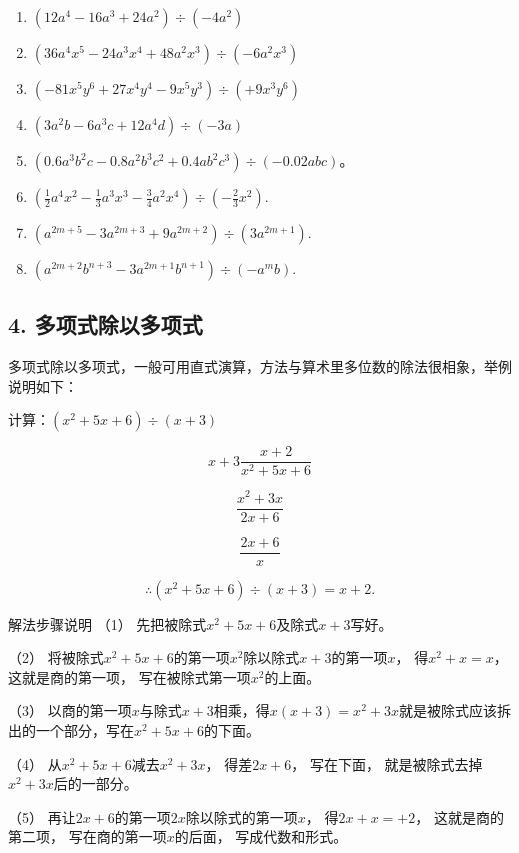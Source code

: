\begin{enumerate}[start=1]
\item
  \((12a^{4} - 16a^{3} + 24a^{2})\div (-4a^{2})\)
\item
  \((36a^{4}x^{5} - 24a^{3}x^{4} + 48a^{2}x^{3})\div (-6a^{2}x^{3})\)
\item
  \((-81x^{5}y^{6} + 27x^{4}y^{4} - 9x^{5}y^{3})\div (+9x^{3}y^{6})\)
\item
  \((3a^{2}b - 6a^{3}c + 12a^{4}d)\div (-3a)\)
\item
  \((0.6a^{3}b^{2}c - 0.8a^{2}b^{3}c^{2} + 0.4ab^{2}c^{3})\div (-0.02abc)\)。
\item
  \(\left(\frac{1}{2} a^4 x^2 -\frac{1}{3} a^3 x^3 -\frac{3}{4} a^2 x^4\right)\div \left(-\frac{2}{3} x^2\right).\)
\item
  \((a^{2m + 5} - 3a^{2m + 3} + 9a^{2m + 2})\div (3a^{2m + 1}).\)
\item
  \((a^{2m + 2}b^{n + 3} - 3a^{2m + 1}b^{n + 1})\div (-a^{m}b).\)
\end{enumerate}

\subsection{4. 多项式除以多项式}

多项式除以多项式，一般可用直式演算，方法与算术里多位数的除法很相象，举例说明如下：

 计算：\((x^{2} + 5x + 6)\div (x + 3)\)


\[
x + 3 \frac{x + 2}{x ^{2} + 5 x + 6}
\]

\[
\frac{x ^{2} + 3 x}{2 x + 6}
\]

\[
\frac{2 x + 6}{x}
\]

\[
\therefore (x ^{2} + 5 x + 6) \div (x + 3) = x + 2.
\]

解法步骤说明 （1） 先把被除式\(x^{2} + 5x + 6\)及除式\(x + 3\)写好。

（2）
将被除式\(x^{2} + 5x + 6\)的第一项\(x^{2}\)除以除式\(x + 3\)的第一项\(x\)，
得\(x^{2} + x = x\)， 这就是商的第一项，
写在被除式第一项\(x^{2}\)的上面。

（3）
以商的第一项\(x\)与除式\(x + 3\)相乘，得\(x(x + 3) = x^2 + 3x\)就是被除式应该拆出的一个部分，写在\(x^2 + 5x + 6\)的下面。

（4） 从\(x^{2} + 5x + 6\)减去\(x^{2} + 3x\)， 得差\(2x + 6\)，
写在下面， 就是被除式去掉\(x^{2} + 3x\)后的一部分。

（5） 再让\(2x + 6\)的第一项\(2x\)除以除式的第一项\(x\)，
得\(2x + x = +2\)， 这就是商的第二项， 写在商的第一项\(x\)的后面，
写成代数和形式。


